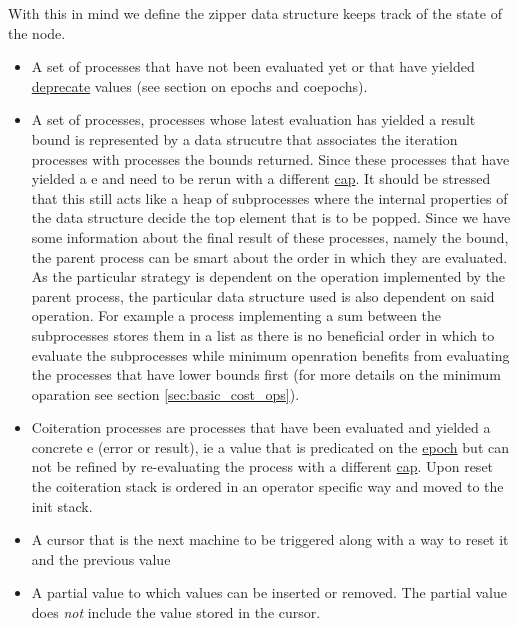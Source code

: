 With this in mind we define the zipper data structure keeps track of
the state of the node.

\begin{itemize}
\item A set of  processes that have not been evaluated
  yet or that have yielded \hyperref[sec:epochs_coepochs]{deprecate}
  values (see section on epochs and coepochs).
\item A set of  processes, processes whose latest
  evaluation has yielded a result bound is represented by a data
  strucutre that associates the iteration processes with
   processes the bounds returned. Since these processes
  that have yielded a e and need to be rerun with a different
  \hyperref[sec:caps_and_bounds]{cap}. It should be stressed that this
  still acts like a heap of subprocesses where the internal properties
  of the data structure decide the top element that is to be
  popped. Since we have some information about the final result of
  these processes, namely the bound, the parent process can be smart
  about the order in which they are evaluated. As the particular
  strategy is dependent on the operation implemented by the parent
  process, the particular data structure used is also dependent on
  said operation. For example a process implementing a sum between the
  subprocesses stores them in a list as there is no beneficial order
  in which to evaluate the subprocesses while minimum openration
  benefits from evaluating the processes that have lower bounds first
  (for more details on the minimum oparation see section
  \ref{sec:basic_cost_ops}).
\item Coiteration processes are processes that have been evaluated and
  yielded a concrete e (error or result), ie a value that is
  predicated on the \hyperref[sec:epochs_coepochs]{epoch} but can not
  be refined by re-evaluating the process with a different
  \hyperref[sec:caps_and_bounds]{cap}. Upon reset the coiteration
  stack is ordered in an operator specific way and moved to the init
  stack.
\item A cursor that is the next machine to be triggered along with a
  way to reset it and the previous value
\item A partial value to which values can be inserted or removed. The
  partial value does \emph{not} include the value stored in the
  cursor.
\end{itemize}

